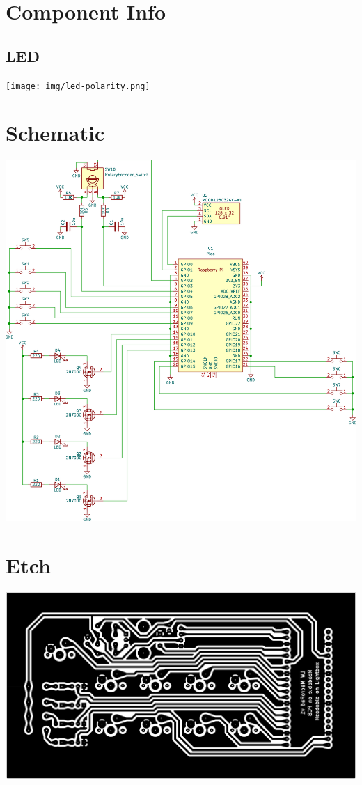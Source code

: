 \section{Component Info}

\begin{minipage}[t]{0.4\textwidth}
\begin{framed}
\subsection*{LED}
\texttt{[image: img/led-polarity.png]}
\end{framed}
\end{minipage}


\section{Schematic}
\includegraphics[width=\textwidth]{img/macropad-rev1-schematic.png}

\section{Etch}
\label{sec:etch}
\includegraphics[width=\textwidth]{img/macropad-rev1-B_Cu_Oversized.png}

